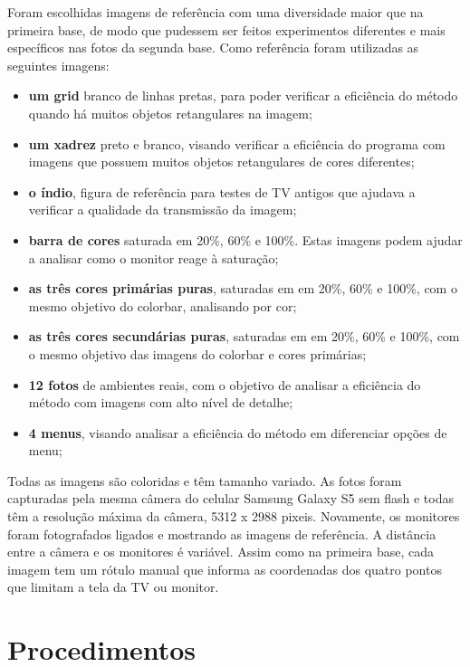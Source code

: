 Foram escolhidas imagens de referência com uma diversidade maior que na primeira base, de modo que pudessem ser feitos experimentos diferentes e mais específicos nas fotos da segunda base. Como referência foram utilizadas as seguintes imagens:
\begin{itemize}
\item \textbf{um grid} branco de linhas pretas, para poder verificar a eficiência do método quando há muitos objetos retangulares na imagem;
\item \textbf{um xadrez} preto e branco, visando verificar a eficiência do programa com imagens que possuem muitos objetos retangulares de cores diferentes;
\item \textbf{o índio}, figura de referência para testes de TV antigos que ajudava a verificar a qualidade da transmissão da imagem;
\item \textbf{barra de cores} saturada em 20\%, 60\% e 100\%. Estas imagens podem ajudar a analisar como o monitor reage à saturação;
\item \textbf{as três cores primárias puras}, saturadas em em 20\%, 60\% e 100\%, com o mesmo objetivo do colorbar, analisando por cor;
\item \textbf{as três cores secundárias puras}, saturadas em em 20\%, 60\% e 100\%, com o mesmo objetivo das imagens do colorbar e cores primárias;
\item \textbf{12 fotos} de ambientes reais, com o objetivo de analisar a eficiência do método com imagens com alto nível de detalhe;
\item \textbf{4 menus}, visando analisar a eficiência do método em diferenciar opções de menu;
\end{itemize}

Todas as imagens são coloridas e têm tamanho variado. As fotos foram capturadas pela mesma câmera do celular Samsung Galaxy S5 sem flash e todas têm a resolução máxima da câmera, 5312 x 2988 pixeis. Novamente, os monitores foram fotografados ligados e mostrando as imagens de referência. A distância entre a câmera e os monitores é variável. Assim como na primeira base, cada imagem tem um rótulo manual que informa as coordenadas dos quatro pontos que limitam a tela da TV ou monitor.

\section{Procedimentos}

